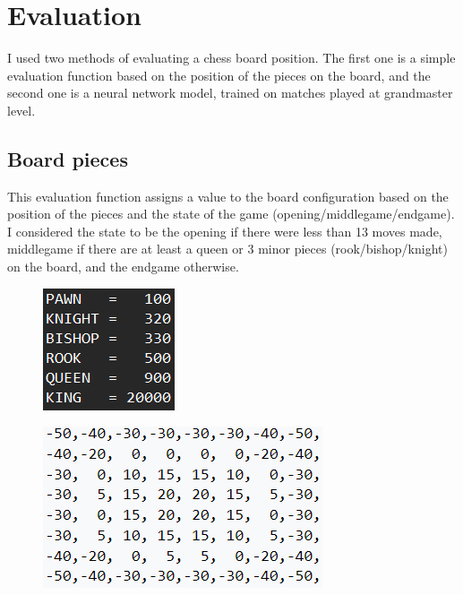 \section{Evaluation}
\label{sec:ch4sec3}

I used two methods of evaluating a chess board position. The first one is a simple evaluation function based on the position of the pieces on the board, and the second one is a neural network model, trained on matches played at grandmaster level.

\subsection{Board pieces}
\label{subsec:ch4sec3subsec1}

This evaluation function assigns a value to the board configuration based on the position of the pieces and the state of the game (opening/middlegame/endgame). I considered the state to be the opening if there were less than 13 moves made, middlegame if there are at least a queen or 3 minor pieces (rook/bishop/knight) on the board, and the endgame otherwise.

\begin{figure}[h]
    \centering
    \begin{minipage}{.49\textwidth}
      \centering
      \includegraphics{figures/pieces_values.png}
      \label{fig:piecesValues}
    \end{minipage}
    \begin{minipage}{.49\textwidth}
      \centering
      \includegraphics{figures/knight_value_table.png}
      \label{fig:knightValueTable}
    \end{minipage}
\end{figure}

